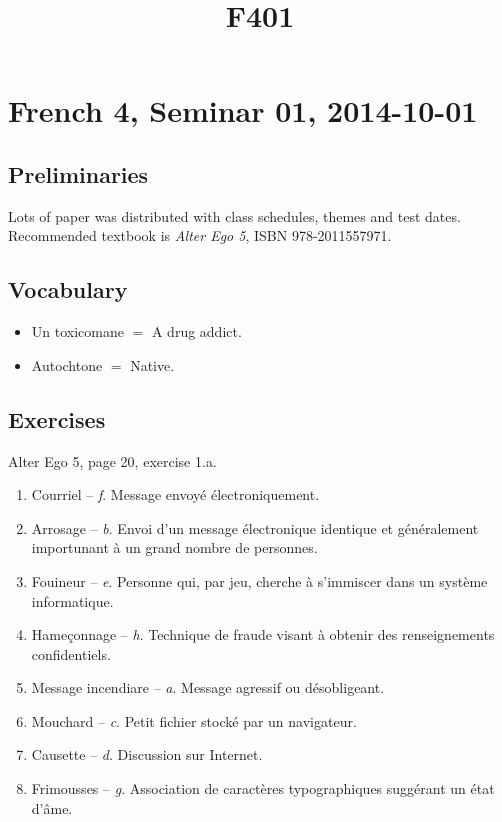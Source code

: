 \documentclass[12pt]{article}
\title{F401}
\begin{document}
\section*{French 4, Seminar 01, 2014-10-01}

\subsection*{Preliminaries}

Lots of paper was distributed with class schedules, themes and test dates. Recommended textbook is \textit{Alter Ego 5}, ISBN 978-2011557971.

\subsection*{Vocabulary}

\begin{itemize}
  \item{Un toxicomane $=$ A drug addict.}
  \item{Autochtone $=$ Native.}
\end{itemize}

\subsection*{Exercises}

Alter Ego 5, page 20, exercise 1.a.

\begin{enumerate}
  \item{Courriel -- \textit{f}. Message envoyé électroniquement.}
  \item{Arrosage -- \textit{b}. Envoi d'un message électronique identique et généralement importunant à un grand nombre de personnes.}
  \item{Fouineur -- \textit{e}. Personne qui, par jeu, cherche à s'immiscer dans un système informatique.}
  \item{Hameçonnage -- \textit{h}. Technique de fraude visant à obtenir des renseignements confidentiels.}
  \item{Message incendiare -- \textit{a}. Message agressif ou désobligeant.}
  \item{Mouchard -- \textit{c}. Petit fichier stocké par un navigateur.}
  \item{Causette -- \textit{d}. Discussion sur Internet.}
  \item{Frimousses -- \textit{g}. Association de caractères typographiques suggérant un état d'âme.}
\end{enumerate}
\end{document}
